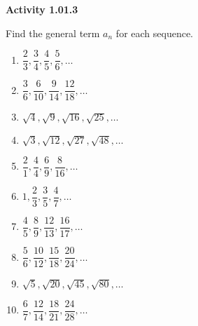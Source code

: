 \vspace{0.3ex}
\noindent\textbf{Activity 1.01.3}

\vspace{0.2ex}

Find the general term $a_n$ for each sequence.
\begin{multicols}{2}
\begin{enumerate}
    \item $\dfrac{2}{3}, \dfrac{3}{4}, \dfrac{4}{5}, \dfrac{5}{6}, \dots$
    \item $\dfrac{3}{6}, \dfrac{6}{10}, \dfrac{9}{14}, \dfrac{12}{18}, \dots$
    \item $\sqrt{4}, \sqrt{9}, \sqrt{16}, \sqrt{25}, \dots$
    \item $\sqrt{3}, \sqrt{12}, \sqrt{27}, \sqrt{48}, \dots$
    \item $\dfrac{2}{1}, \dfrac{4}{4}, \dfrac{6}{9}, \dfrac{8}{16}, \dots$
    \item $1, \dfrac{2}{3}, \dfrac{3}{5}, \dfrac{4}{7}, \dots$
    \item $\dfrac{4}{5}, \dfrac{8}{9}, \dfrac{12}{13}, \dfrac{16}{17}, \dots$
    \item $\dfrac{5}{6}, \dfrac{10}{12}, \dfrac{15}{18}, \dfrac{20}{24}, \dots$
    \item $\sqrt{5}, \sqrt{20}, \sqrt{45}, \sqrt{80}, \dots$
    \item $\dfrac{6}{7}, \dfrac{12}{14}, \dfrac{18}{21}, \dfrac{24}{28}, \dots$
\end{enumerate}
\end{multicols}
